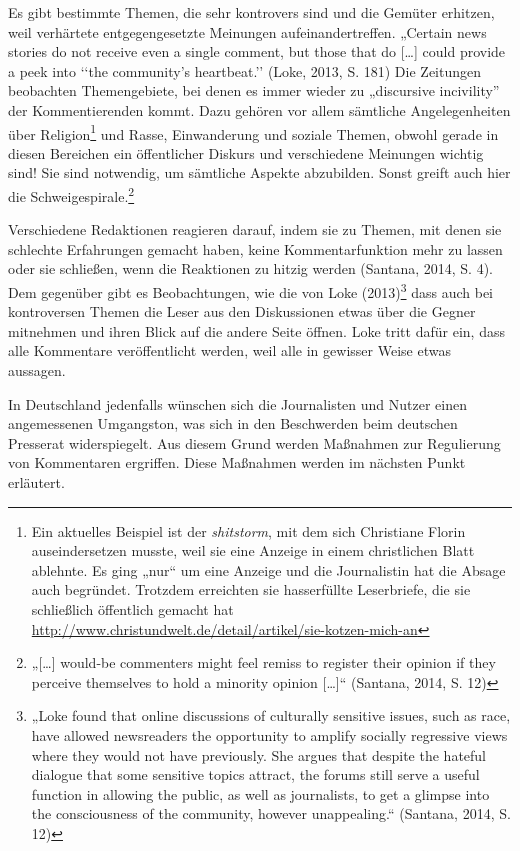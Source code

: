 \begin{enumerate}
Es gibt bestimmte Themen, die sehr kontrovers sind und die Gemüter erhitzen,
weil verhärtete entgegengesetzte Meinungen aufeinandertreffen.   „Certain news
stories do not receive even a single comment, but those that do [\ldots] could
provide a peek into ‘‘the community’s heartbeat.’’ (Loke, 2013, S. 181)
Die Zeitungen beobachten Themengebiete, bei denen es immer wieder zu „discursive
incivility” der Kommentierenden kommt. Dazu gehören vor allem sämtliche
Angelegenheiten über Religion\footnote{Ein aktuelles Beispiel ist der
{\slshape shitstorm}, mit dem sich Christiane Florin auseindersetzen musste, weil
sie eine Anzeige in einem christlichen Blatt ablehnte. Es ging „nur“ um eine
Anzeige und die Journalistin hat die Absage auch begründet. Trotzdem erreichten
sie hasserfüllte Leserbriefe, die sie schließlich öffentlich gemacht hat
\url{http://www.christundwelt.de/detail/artikel/sie-kotzen-mich-an}} und Rasse,
Einwanderung und soziale Themen, obwohl gerade in diesen Bereichen ein
öffentlicher Diskurs und verschiedene Meinungen wichtig sind! Sie sind
notwendig, um sämtliche Aspekte abzubilden. Sonst greift auch hier die
Schweigespirale.\footnote{„[\ldots] would-be commenters might feel remiss
to register their opinion if they perceive themselves to hold a minority opinion
[\ldots]“ (Santana, 2014, S. 12)}


Verschiedene Redaktionen reagieren darauf, indem sie zu Themen, mit denen sie
schlechte Erfahrungen gemacht haben, keine Kommentarfunktion mehr zu lassen oder
sie schließen, wenn die Reaktionen zu hitzig werden (Santana, 2014, S. 4). 
Dem gegenüber gibt es Beobachtungen, wie die von Loke (2013)\footnote{„Loke
found that online discussions of culturally sensitive issues, such as race, have
allowed newsreaders the opportunity to amplify socially regressive views where
they would not have previously. She argues that despite the hateful dialogue
that some sensitive topics attract, the forums still serve a useful function in
allowing the public, as well as journalists, to get a glimpse into the
consciousness of the community, however unappealing.“ (Santana, 2014, S. 12)}
dass auch bei kontroversen Themen die Leser aus den Diskussionen etwas über die
Gegner mitnehmen und ihren Blick auf die andere Seite öffnen. Loke tritt dafür
ein, dass alle Kommentare veröffentlicht werden, weil alle in gewisser Weise
etwas aussagen. 

In Deutschland jedenfalls wünschen sich die Journalisten und Nutzer einen
angemessenen Umgangston, was sich in den Beschwerden beim deutschen Presserat
widerspiegelt. Aus diesem Grund werden Maßnahmen zur Regulierung von Kommentaren
ergriffen. Diese Maßnahmen werden im nächsten Punkt erläutert.



\end{enumerate}





